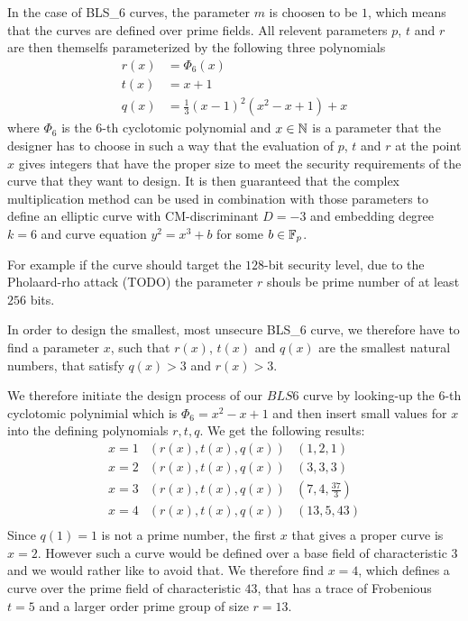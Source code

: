 In the case of BLS\_6 curves, the parameter $m$ is choosen to be $1$, which means that the curves are defined over prime fields. All relevent parameters $p$, $t$ and $r$ are then themselfs parameterized by the following three polynomials
\begin{align*}
r(x) &= \Phi_6(x)\\
t(x) &= x+1\\
q(x) &= \frac{1}{3}(x-1)^2(x^{2}-x+1) +x
\end{align*}
where $\Phi_6$ is the $6$-th cyclotomic polynomial and  $x\in\mathbb{N}$ is a parameter that the designer has to choose in such a way that the evaluation of $p$, $t$ and $r$ at the point $x$ gives integers that have the proper size to meet the security requirements of the curve that they want to design. It is then guaranteed that the complex multiplication method can be used in combination with those parameters to define an elliptic curve with CM-discriminant $D=-3$ and embedding degree $k=6$ and curve equation $y^2 = x^3 +b$ for some $b\in\mathbb{F}_p$.

For example if the curve should target the $128$-bit security level, due to the Pholaard-rho attack (TODO) the parameter $r$ shouls be prime number of at least $256$ bits.

In order to design the smallest, most unsecure BLS\_6 curve, we therefore have to find a parameter $x$, such that $r(x)$, $t(x)$ and $q(x)$ are the smallest natural numbers, that satisfy $q(x)>3$ and $r(x)>3$.

We therefore initiate the design process of our $BLS6$ curve by looking-up the $6$-th cyclotomic polynimial which is $\Phi_{6}=x^2-x+1$ and then insert small values for $x$ into the defining polynomials $r,t,q$. We get the following results:
$$
\begin{array}{lcr}
x=1 & (r(x),t(x),q(x)) & (1,2,1)\\
x=2 & (r(x),t(x),q(x)) & (3,3,3)\\
x=3 & (r(x),t(x),q(x)) & (7,4,\frac{37}{3})\\
x=4 & (r(x),t(x),q(x)) & (13,5,43)\\
\end{array}
$$
Since $q(1)=1$ is not a prime number, the first $x$ that gives a proper curve is $x=2$. However such a curve would be defined over a base field of characteristic $3$ and we would rather like to avoid that. We therefore find $x=4$, which defines a curve over the prime field of characteristic $43$, that has a trace of Frobenious $t=5$ and a larger order prime group of size $r=13$.

